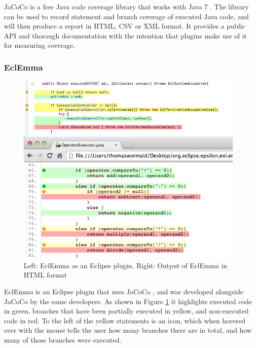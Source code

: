 JaCoCo is a free Java code coverage library that works with Java 7 \cite{JaCoCo}. The library can be used to record statement and branch coverage of executed Java code, and will then produce a report in HTML, CSV or XML format. It provides a public API and thorough documentation with the intention that plugins make use of it for measuring coverage.

\subsubsection{EclEmma}

\begin{figure}
\begin{minipage}[b]{0.44\textwidth}
\centering
\includegraphics[width=0.9\linewidth]{figures/EclEmma}
\end{minipage}
\begin{minipage}[b]{0.1\textwidth}
\vspace{3.00mm}
\end{minipage}
\begin{minipage}[b]{0.44\textwidth}
\centering
\includegraphics[width=0.9\linewidth]{figures/EclEmmaHTML}
\end{minipage}
\caption{Left: EclEmma as an Eclipse plugin. Right: Output of EclEmma in HTML format}
\label{fig:eclemma}
\end{figure}

EclEmma is an Eclipse plugin that uses JaCoCo \cite{EclEmma}, and was developed alongside JaCoCo by the same developers. As shown in Figure \ref{fig:eclemma} it highlights executed code in green, branches that have been partially executed in yellow, and non-executed code in red. To the left of the yellow statements is an icon, which when hovered over with the mouse tells the user how many branches there are in total, and how many of those branches were executed.

